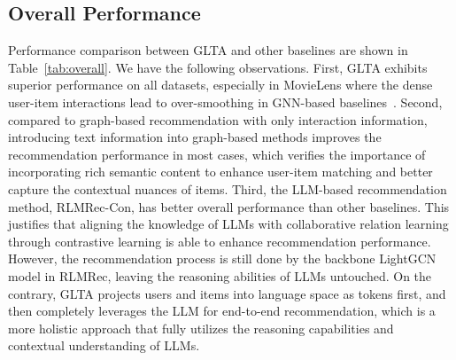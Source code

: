 \subsection{Overall Performance}
Performance comparison between GLTA and other baselines are shown in Table~\ref{tab:overall}. We have the following observations. First,  GLTA exhibits superior performance on all datasets, especially in MovieLens where the dense user-item interactions lead to over-smoothing in GNN-based baselines~\cite{oversmooth2}. Second, compared to graph-based recommendation with only interaction information, introducing text information into graph-based methods improves the recommendation performance in most cases, which verifies the importance of incorporating rich semantic content to enhance user-item matching and better capture the contextual nuances of items. Third, the LLM-based recommendation method, RLMRec-Con, has better overall performance than other baselines. This justifies that aligning the knowledge of LLMs with collaborative
relation learning through contrastive learning is able to enhance recommendation performance. However, the recommendation process is still done by the backbone LightGCN model in RLMRec, leaving the reasoning abilities of LLMs untouched. On the contrary, GLTA projects users and items into language space as tokens first, and then completely leverages the LLM for end-to-end recommendation, which is a more holistic approach that fully utilizes the reasoning capabilities and contextual understanding of LLMs.

